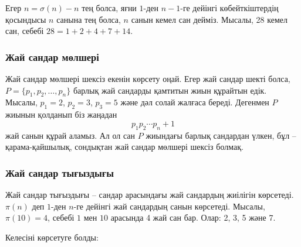 
Егер $n=\sigma(n)-n$ тең болса,
яғни $1$-ден $n-1$-ге дейінгі көбейткіштердің қосындысы
$n$ санына тең болса, $n$ санын кемел сан дейміз.
Мысалы, 28 кемел сан, себебі $28=1+2+4+7+14$.

\subsubsection{Жай сандар мөлшері}

Жай сандар мөлшері шексіз екенін көрсету оңай.
Егер жай сандар шекті болса, $P=\{p_1,p_2,\ldots,p_n\}$
барлық жай сандарды қамтитын жиын құрайтын едік.
Мысалы, $p_1=2$, $p_2=3$, $p_3=5$ және дәл солай жалғаса
береді. Дегенмен $P$ жиынын қолданып біз жаңадан
\[p_1 p_2 \cdots p_n+1\] жай санын құрай аламыз.
Ал ол сан $P$ жиындағы барлық сандардан үлкен,
бұл -- қарама-қайшылық, сондықтан жай сандар мөлшері
шексіз болмақ.

\subsubsection{Жай сандар тығыздығы}

Жай сандар тығыздығы -- сандар арасындағы жай сандардың
жиілігін көрсетеді.
$\pi(n)$ деп $1$-ден $n$-ге дейінгі жай сандардың санын көрсетеді.
Мысалы, $\pi(10)=4$, себебі $1$ мен $10$ арасында 4 жай сан бар. Олар:
2, 3, 5 және 7.

Келесіні көрсетуге болды:

